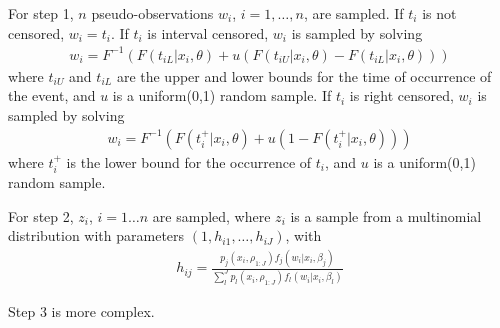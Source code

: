 \documentclass[11pt,letterpaper]{article}
\begin{document}
For step 1, $n$ pseudo-observations $w_i$, $i=1,\dots, n$,  are sampled. If $t_i$ is not censored, $w_i = t_i$. If $t_i$ is interval censored, $w_i$ is sampled by solving
\begin{align*}
    w_i = F^{-1}\left( F(t_{iL} | x_i, \theta ) + u\left( F(t_{iU}|x_i, \theta) - F(t_{iL}|x_i, \theta) \right)  \right)
\end{align*}
where $t_{iU}$ and $t_{iL}$ are the upper and lower bounds for the time of occurrence of the event, and $u$ is a uniform(0,1) random sample.
If $t_i$ is right censored, $w_i$ is sampled by solving
\begin{align*}
    w_i = F^{-1}\left( F(t_i^+ | x_i, \theta ) + u\left( 1 - F(t_i^+|x_i, \theta)\right)  \right)
\end{align*}
where $t_{i}^+$ is the lower bound for the occurrence of $t_i$, and $u$ is a uniform(0,1) random sample.

For step 2, $z_i$, $i=1\dots n$ are sampled, where $z_i$ is a sample from a multinomial distribution with parameters $(1, h_{i1}, \dots, h_{iJ})$, with
\begin{align*}
    h_{ij} = \frac{ p_j(x_i, \rho_{1:J}) f_j(w_i | x_i, \beta_j) } { \sum_l^J p_l(x_i, \rho_{1:J}) f_l(w_i | x_i, \beta_l) }
\end{align*}

Step 3 is more complex.
\end{document}
